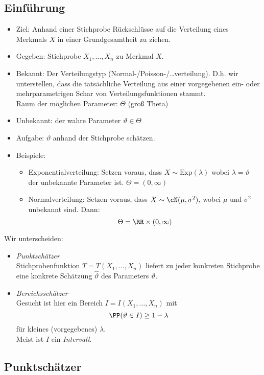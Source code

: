 \documentclass{scrreprt}
\begin{document}
\subsection{Einführung}
\begin{itemize}
\item Ziel: Anhand einer Stichprobe Rückschlüsse auf die Verteilung eines Merkmals $X$ in einer Grundgesamtheit zu ziehen.
\item Gegeben: Stichprobe $X_1,\ldots, X_n$ zu Merkmal $X$.
\item Bekannt: Der Verteilungstyp (Normal-/Poisson-/…verteilung). D.h. wir unterstellen, dass die tatsächliche Verteilung aus einer vorgegebenen ein- oder mehrparametrigen Schar von Verteilungsfunktionen stammt.\\
Raum der möglichen Parameter: $\Theta$ (groß Theta)
\item Unbekannt: der wahre Parameter $\vartheta \in \Theta$
\item Aufgabe: $\vartheta$ anhand der Stichprobe schätzen.
\item Beispiele: 
\begin{itemize}
\item Exponentialverteilung: Setzen voraus, dass $X\sim \mathrm{Exp}(\lambda)$ wobei $\lambda = \vartheta$ der unbekannte Parameter ist. $\Theta =(0,\infty) $
\item Normalverteilung: Setzen voraus, dass $X\sim \cN (\mu, \sigma^2)$, wobei $\mu$ und $\sigma^2$ unbekannt sind. Dann:
$$\Theta = \RR \times (0,\infty)$$
\end{itemize}
\end{itemize}
Wir unterscheiden:
\begin{itemize}
\item \emph{Punktschätzer}\\
Stichprobenfunktion $T=T(X_1,\ldots, X_n)$ liefert zu jeder konkreten Stichprobe eine konkrete Schätzung $\hat{\vartheta}$ des Parameters $\vartheta$.
\item \emph{Bereichsschätzer}\\
Gesucht ist hier ein Bereich $I=I(X_1,\ldots, X_n)$ mit 
$$\PP(\vartheta \in I) \geq 1-\lambda$$
für kleines (vorgegebenes) $\lambda$.\\
Meist ist $I$ ein \emph{Intervall}.
\end{itemize}

\subsection{Punktschätzer}
\end{document}
